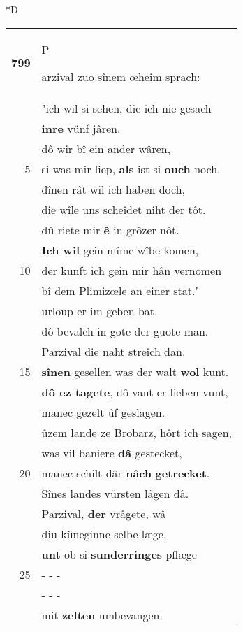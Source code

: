 \documentclass[8pt,a4paper,notitlepage]{article}
\begin{document}
\begin{table}[ht]
\begin{minipage}[t]{0.5\linewidth}
\small
\begin{center}*D
\end{center}
\begin{tabular}{rl}
\textbf{799} & \begin{large}P\end{large}arzival zuo sînem œheim sprach:\\ 
 & "ich wil si sehen, die ich nie gesach\\ 
 & \textbf{inre} vünf jâren.\\ 
 & dô wir bî ein ander wâren,\\ 
5 & si was mir liep, \textbf{als} ist si \textbf{ouch} noch.\\ 
 & dînen rât wil ich haben doch,\\ 
 & die wîle uns scheidet niht der tôt.\\ 
 & dû riete mir \textbf{ê} in grôzer nôt.\\ 
 & \textbf{Ich wil} gein mîme wîbe komen,\\ 
10 & der kunft ich gein mir hân vernomen\\ 
 & bî dem Plimizœle an einer stat."\\ 
 & urloup er im geben bat.\\ 
 & dô bevalch in gote der guote man.\\ 
 & Parzival die naht streich dan.\\ 
15 & \textbf{sînen} gesellen was der walt \textbf{wol} kunt.\\ 
 & \textbf{dô ez tagete}, dô vant er lieben vunt,\\ 
 & manec gezelt ûf geslagen.\\ 
 & ûzem lande ze Brobarz, hôrt ich sagen,\\ 
 & was vil baniere \textbf{dâ} gestecket,\\ 
20 & manec schilt dâr \textbf{nâch} \textbf{getrecket}.\\ 
 & Sînes landes vürsten lâgen dâ.\\ 
 & Parzival, \textbf{der} vrâgete, wâ\\ 
 & diu küneginne selbe læge,\\ 
 & \textbf{unt} ob si \textbf{sunderringes} pflæge\\ 
25 & \multicolumn{1}{l}{ - - - }\\ 
 & \multicolumn{1}{l}{ - - - }\\ 
 & mit \textbf{zelten} umbevangen.\\ 

\end{tabular}
\end{minipage}
\end{table}
\end{document}
